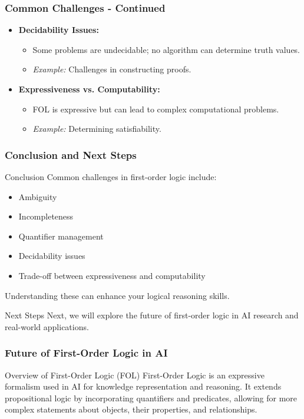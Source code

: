 \documentclass[aspectratio=169]{beamer}
\begin{document}
\begin{frame}[fragile]
    \frametitle{Common Challenges - Continued}
    \begin{itemize}
        \item \textbf{Decidability Issues:}
        \begin{itemize}
            \item Some problems are undecidable; no algorithm can determine truth values.
            \item \textit{Example:} Challenges in constructing proofs.
        \end{itemize}

        \item \textbf{Expressiveness vs. Computability:}
        \begin{itemize}
            \item FOL is expressive but can lead to complex computational problems.
            \item \textit{Example:} Determining satisfiability.
        \end{itemize}
    \end{itemize}
\end{frame}

\begin{frame}[fragile]
    \frametitle{Conclusion and Next Steps}
    \begin{block}{Conclusion}
        Common challenges in first-order logic include:
        \begin{itemize}
            \item Ambiguity
            \item Incompleteness
            \item Quantifier management
            \item Decidability issues
            \item Trade-off between expressiveness and computability
        \end{itemize}
        Understanding these can enhance your logical reasoning skills.
    \end{block}

    \begin{block}{Next Steps}
        Next, we will explore the future of first-order logic in AI research and real-world applications.
    \end{block}
\end{frame}

\begin{frame}[fragile]
    \frametitle{Future of First-Order Logic in AI}
    \begin{block}{Overview of First-Order Logic (FOL)}
        First-Order Logic is an expressive formalism used in AI for knowledge representation and reasoning. It extends propositional logic by incorporating quantifiers and predicates, allowing for more complex statements about objects, their properties, and relationships.
    \end{block}
\end{frame}
\end{document}
